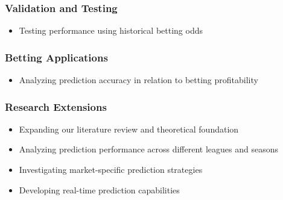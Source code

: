 \documentclass[conference]{IEEEtran}
\begin{document}
\subsubsection{Validation and Testing}
\begin{itemize}
\item Testing performance using historical betting odds
\end{itemize}

\subsubsection{Betting Applications}
\begin{itemize}
\item Analyzing prediction accuracy in relation to betting profitability
\end{itemize}

\subsubsection{Research Extensions}
\begin{itemize}
\item Expanding our literature review and theoretical foundation
\item Analyzing prediction performance across different leagues and seasons
\item Investigating market-specific prediction strategies
\item Developing real-time prediction capabilities
\end{itemize}
\end{document}
